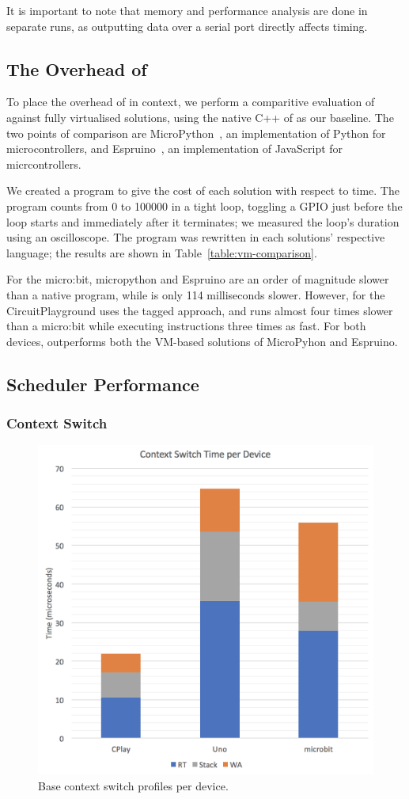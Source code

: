 It is important to note that memory and performance analysis are done in separate runs, as outputting data over a serial port directly affects timing.

\subsection{The Overhead of \MC}

To place the overhead of \MC in context, we perform a comparitive evaluation of \MC against fully virtualised solutions, using the native C++ of \CO as our baseline.  The two points of comparison are MicroPython~\cite{MicroPython}, an implementation of Python for microcontrollers, and Espruino~\cite{espruinoBook}, an
implementation of JavaScript for micrcontrollers.

We created a program to give the cost of each solution with respect to time. The program counts from 0 to 100000 in a tight loop, toggling a GPIO just before the loop starts and immediately after it terminates; we measured the loop's duration using an oscilloscope. The program was rewritten in each solutions' respective language; the results are shown in Table~\ref{table:vm-comparison}.

For the micro:bit, micropython and Espruino are an order of magnitude slower than a native \CO program, while \MC is only 114 milliseconds slower. However, \MC for the CircuitPlayground uses the tagged approach, and runs almost four times slower than a micro:bit while executing instructions three times as fast. For both devices, \MC outperforms both the VM-based solutions of MicroPyhon and Espruino.



\subsection{Scheduler Performance}

\subsubsection{Context Switch}

\begin{figure}[ht]
    \includegraphics[width=.6\columnwidth]{images/context-switch.png}
\caption{\label{fig:context-switch}Base context switch profiles per device.}
\end{figure}

